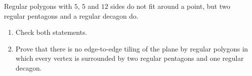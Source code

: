 Regular polygons with $5$, $5$ and $12$ sides do not fit around a point, but two regular pentagons and a regular decagon do.
\begin{enumerate}
\item[(a)] Check both statements.
\item[(b)] Prove that there is no edge-to-edge tiling of the plane by regular polygons in which every vertex is surrounded by two regular pentagons and one regular decagon.
\end{enumerate}
